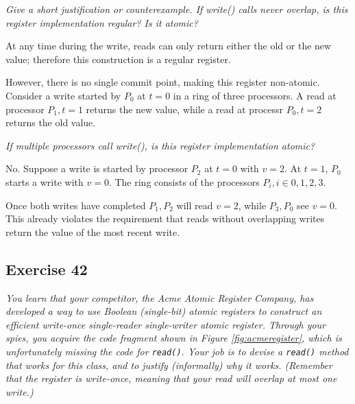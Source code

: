 \documentclass[a4paper,10pt]{article}
\begin{document}
\emph{Give a short justification or counterexample.
If write() calls never overlap, is this register implementation regular? Is it atomic?}

\vspace{3mm}

At any time during the write, reads can only return either the old or the new value;
therefore this construction is a regular register. 

However, there is no single commit point, making this register non-atomic. Consider
a write started by $P_0$ at $t = 0$ in a ring
of three processors. A read at processor $P_1, t = 1$ returns the new value,
while a read at processr $P_0, t = 2$ returns the old value.

\vspace{3mm}

\emph{If multiple processors call write(), is this register implementation atomic?}

\vspace{3mm}

No. Suppose a write is started by processor $P_2$ at $t = 0$ with $v = 2$. At
$t = 1$, $P_0$ starts a write with $v = 0$. The ring consists of the processors $P_i, i \in 0, 1, 2, 3$.

Once both writes have completed $P_1, P_2$ will read $v = 2$, while $P_3, P_0$ 
see $v = 0$. This already violates the requirement that reads without overlapping
writes return the value of the most recent write.

\subsection{Exercise 42}

\emph{You learn that your competitor, the Acme Atomic Register Company, has 
developed a way to use Boolean (single-bit) atomic registers to construct
an efficient write-once single-reader single-writer atomic register. Through your
spies, you acquire the code fragment shown in Figure \ref{fig:acmeregister}, which is unfortunately
missing the code for \lstinline|read()|. Your job is to devise a \lstinline|read()| method that works for
this class, and to justify (informally) why it works. (Remember that the register is
write-once, meaning that your read will overlap at most one write.)}
\end{document}
